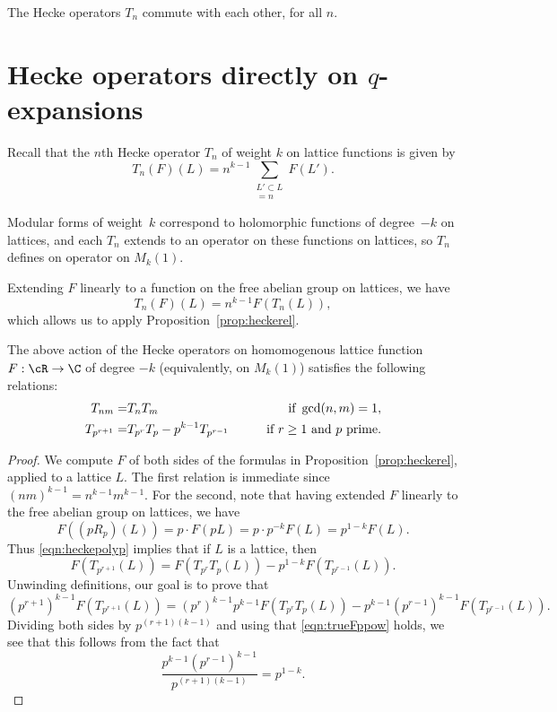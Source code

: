 \documentclass{report}
\begin{document}
\begin{corollary}
The Hecke operators $T_n$ commute with each other, for all $n$.
\end{corollary}



\section{Hecke operators directly on $q$-expansions}
Recall that the $n$th Hecke operator $T_n$ of weight $k$ on
lattice functions is given by
\begin{equation}
\label{eqn:TnF}
T_n(F)(L)=n^{k-1}\sum_{\substack{L'\subset L\\ [L:L']=n}} F(L').
\end{equation}

Modular forms of weight~$k$ correspond to holomorphic functions of
degree~$-k$ on lattices, and each $T_n$ extends to an operator on
these functions on lattices, so $T_n$ defines on operator on $M_k(1)$.


Extending $F$ linearly to a function on the free abelian group on lattices,
we have
$$
 T_n(F)(L) = n^{k-1} F(T_n(L)),
$$
which allows us to apply Proposition~\ref{prop:heckerel}.
\begin{proposition}
The above action of the Hecke operators on
homomogenous lattice function $F:\cR\to \C$ of degree $-k$
(equivalently, on $M_k(1)$)
satisfies the following relations:
\begin{eqnarray*}
  T_{nm} =& T_n T_m \qquad\qquad\quad\,\,\,{} & \qquad\text{if }\gcd(n,m)=1,\\
 T_{p^{r+1}} =& T_{p^r} T_p - p^{k-1} T_{p^{r-1}} \hfill & \qquad\text{if } r\geq 1\text{ and } p \text{ prime.}
\end{eqnarray*}
\end{proposition}
\begin{proof}
  We compute $F$ of both sides of the formulas in
  Proposition~\ref{prop:heckerel}, applied to a lattice $L$.
The first relation is immediate since
$(nm)^{k-1} = n^{k-1}m^{k-1}$.  For the
second, note that having extended $F$ linearly to the free
abelian group on lattices, we have
$$
  F((pR_p)(L)) = p\cdot F(pL) = p\cdot p^{-k}F(L) = p^{1-k}F(L).
$$
Thus \eqref{eqn:heckepolyp} implies that if $L$ is a lattice, then
\begin{equation}\label{eqn:trueFppow}
F(T_{p^{r+1}}(L)) = F(T_{p^r} T_p(L)) - p^{1-k} F(T_{p^{r-1}}(L)).
\end{equation}
Unwinding definitions, our goal is to prove that
$$
(p^{r+1})^{k-1} F(T_{p^{r+1}}(L)) = (p^{r})^{k-1} p^{k-1} F(T_{p^r} T_p(L))
   - p^{k-1} (p^{r-1})^{k-1} F(T_{p^{r-1}}(L)).
$$
Dividing both sides by $p^{(r+1)(k-1)}$ and using that \eqref{eqn:trueFppow} holds,
we see that this follows from the fact that
$$
\frac{p^{k-1} (p^{r-1})^{k-1}}{p^{(r+1)(k-1)}} = p^{1-k}.
$$
\end{proof}
\end{document}
